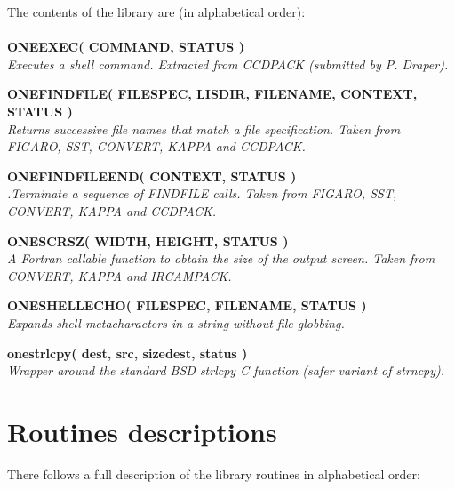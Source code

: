 \documentclass[twoside,11pt]{article}
\newcommand{\noteroutine}[2]{\textbf{#1}\hspace*{\fill}\nopagebreak \\
                             \hspace*{3em}\emph{#2}\hspace*{\fill}\par}
\renewcommand{\_}{\texttt{\symbol{95}}}
\begin{document}
The contents of the library are (in alphabetical order):\\
\\
\noteroutine{ONE\_EXEC( COMMAND, STATUS )}
    {Executes a shell command.
    Extracted from CCDPACK (submitted by P. Draper).}
\noteroutine{ONE\_FIND\_FILE( FILESPEC, LISDIR, FILENAME, CONTEXT, STATUS )}
    {Returns successive file names that match a file specification.
    Taken from FIGARO, SST, CONVERT, KAPPA and CCDPACK.}
\noteroutine{ONE\_FIND\_FILE\_END( CONTEXT, STATUS )}
    {.Terminate a sequence of FIND\_FILE calls.
    Taken from FIGARO, SST, CONVERT, KAPPA and CCDPACK.}
\noteroutine{ONE\_SCRSZ( WIDTH, HEIGHT, STATUS )}
    {A Fortran callable function to obtain the size of the output screen.
    Taken from CONVERT, KAPPA and IRCAMPACK.}
\noteroutine{ONE\_SHELL\_ECHO( FILESPEC, FILENAME, STATUS )}
    {Expands shell metacharacters in a string without file globbing.}
\noteroutine{one\_strlcpy( dest, src, sizedest, status )}
    {Wrapper around the standard BSD strlcpy C function (safer variant of strncpy).}
\section{Routines descriptions}
There follows a full description of the library routines in alphabetical order:
\end{document}
